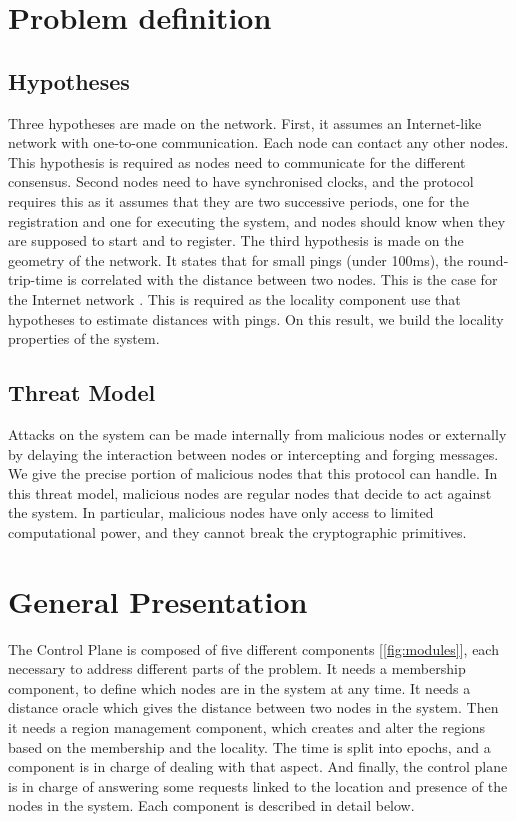 \documentclass[a4paper,11pt,twoside=semi,openright]{report}
\begin{document}
\section{Problem definition}
\subsection{Hypotheses}
Three hypotheses are made on the network. First, it assumes an Internet-like
network with one-to-one communication. Each node can contact any other nodes.
This hypothesis is required as nodes need to communicate for the different
consensus.  Second nodes need to have synchronised clocks, and the protocol
requires this as it assumes that they are two successive periods, one for the
registration and one for executing the system, and nodes should know when they
are supposed to start and to register.  The third hypothesis is made on the
geometry of the network. It states that for small pings (under 100ms), the
round-trip-time is correlated with the distance between two nodes. This is the
case for the Internet network \cite{Seibert2014}. This is required as the
locality component use that hypotheses to estimate distances with pings. On
this result, we build the locality properties of the system. 

\subsection{Threat Model}
Attacks on the system can be made internally from malicious nodes or
externally by delaying the interaction between nodes or intercepting and
forging messages. We give the precise portion of malicious nodes that
this protocol can handle. In this threat model, malicious nodes are regular
nodes that decide to act against the system. In particular, malicious nodes
have only access to limited computational power, and they cannot break the
cryptographic primitives. 

\section{General Presentation}

The Control Plane is composed of five different components
[\autoref{fig:modules}], each necessary to address different parts of the
problem.  It needs a membership component, to define which nodes are in the
system at any time. It needs a distance oracle which gives the distance between
two nodes in the system. Then it needs a region management component, which
creates and alter the regions based on the membership and the locality.  The
time is split into epochs, and a component is in charge of dealing with that
aspect. And finally, the control plane is in charge of answering some requests
linked to the location and presence of the nodes in the system. Each component
is described in detail below. 
\end{document}
